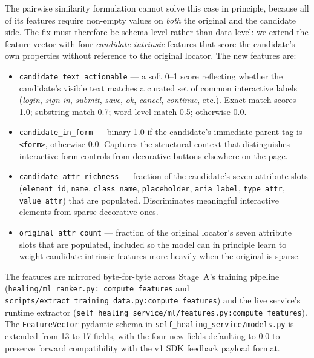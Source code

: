 \documentclass[conference]{IEEEtran}
\begin{document}
The pairwise similarity formulation cannot solve this case in principle, because all of its features require non-empty values on \emph{both} the original and the candidate side. The fix must therefore be schema-level rather than data-level: we extend the feature vector with four \emph{candidate-intrinsic} features that score the candidate's own properties without reference to the original locator. The new features are:

\begin{itemize}[leftmargin=1.4em]
  \item \texttt{candidate\_text\_actionable} --- a soft 0--1 score reflecting whether the candidate's visible text matches a curated set of common interactive labels (\textit{login}, \textit{sign in}, \textit{submit}, \textit{save}, \textit{ok}, \textit{cancel}, \textit{continue}, etc.). Exact match scores 1.0; substring match 0.7; word-level match 0.5; otherwise 0.0.
  \item \texttt{candidate\_in\_form} --- binary 1.0 if the candidate's immediate parent tag is \texttt{<form>}, otherwise 0.0. Captures the structural context that distinguishes interactive form controls from decorative buttons elsewhere on the page.
  \item \texttt{candidate\_attr\_richness} --- fraction of the candidate's seven attribute slots (\texttt{element\_id}, \texttt{name}, \texttt{class\_name}, \texttt{placeholder}, \texttt{aria\_label}, \texttt{type\_attr}, \texttt{value\_attr}) that are populated. Discriminates meaningful interactive elements from sparse decorative ones.
  \item \texttt{original\_attr\_count} --- fraction of the original locator's seven attribute slots that are populated, included so the model can in principle learn to weight candidate-intrinsic features more heavily when the original is sparse.
\end{itemize}

The features are mirrored byte-for-byte across Stage~A's training pipeline (\texttt{healing/ml\_ranker.py:\_compute\_features} and \texttt{scripts/extract\_training\_data.py:compute\_features}) and the live service's runtime extractor (\texttt{self\_healing\_service/ml/features.py:compute\_features}). The \texttt{FeatureVector} pydantic schema in \texttt{self\_healing\_service/models.py} is extended from 13 to 17 fields, with the four new fields defaulting to 0.0 to preserve forward compatibility with the v1 SDK feedback payload format.
\end{document}
